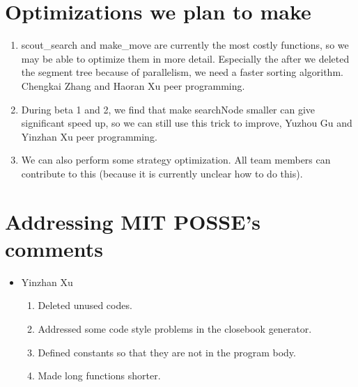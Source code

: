 \documentclass[10pt,twosidep]{article}
\begin{document}
\section{Optimizations we plan to make}

\begin{enumerate}
  \item scout\_search and make\_move are currently the most costly functions, so we may be able to optimize them in more detail. Especially the after we deleted the segment tree because of parallelism, we need a faster sorting algorithm. Chengkai Zhang and Haoran Xu peer programming.
  \item During beta 1 and 2, we find that make searchNode smaller can give significant speed up, so we can still use this trick to improve, Yuzhou Gu and Yinzhan Xu peer programming.
  \item We can also perform some strategy optimization. All team members can contribute to this (because it is currently unclear how to do this).
\end{enumerate}

\section{Addressing MIT POSSE's comments}

\begin{itemize}
	\item Yinzhan Xu
	
	\begin{enumerate}
		\item Deleted unused codes. 
		\item Addressed some code style problems in the closebook generator. 
		\item Defined constants so that they are not in the program body. 
		\item Made long functions shorter. 
	\end{enumerate}
\end{itemize}
\end{document}
